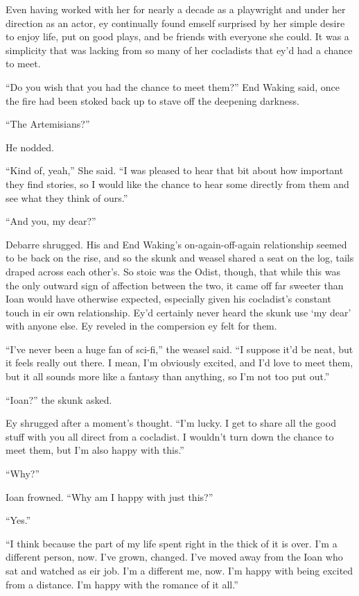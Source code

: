 Even having worked with her for nearly a decade as a playwright and under her direction as an actor, ey continually found emself surprised by her simple desire to enjoy life, put on good plays, and be friends with everyone she could. It was a simplicity that was lacking from so many of her cocladists that ey'd had a chance to meet.

``Do you wish that you had the chance to meet them?'' End Waking said, once the fire had been stoked back up to stave off the deepening darkness.

``The Artemisians?''

He nodded.

``Kind of, yeah,'' She said. ``I was pleased to hear that bit about how important they find stories, so I would like the chance to hear some directly from them and see what they think of ours.''

``And you, my dear?''

Debarre shrugged. His and End Waking's on-again-off-again relationship seemed to be back on the rise, and so the skunk and weasel shared a seat on the log, tails draped across each other's. So stoic was the Odist, though, that while this was the only outward sign of affection between the two, it came off far sweeter than Ioan would have otherwise expected, especially given his cocladist's constant touch in eir own relationship. Ey'd certainly never heard the skunk use `my dear' with anyone else. Ey reveled in the compersion ey felt for them.

``I've never been a huge fan of sci-fi,'' the weasel said. ``I suppose it'd be neat, but it feels really out there. I mean, I'm obviously excited, and I'd love to meet them, but it all sounds more like a fantasy than anything, so I'm not too put out.''

``Ioan?'' the skunk asked.

Ey shrugged after a moment's thought. ``I'm lucky. I get to share all the good stuff with you all direct from a cocladist. I wouldn't turn down the chance to meet them, but I'm also happy with this.''

``Why?''

Ioan frowned. ``Why am I happy with just this?''

``Yes.''

``I think because the part of my life spent right in the thick of it is over. I'm a different person, now. I've grown, changed. I've moved away from the Ioan who sat and watched as eir job. I'm a different me, now. I'm happy with being excited from a distance. I'm happy with the romance of it all.''

